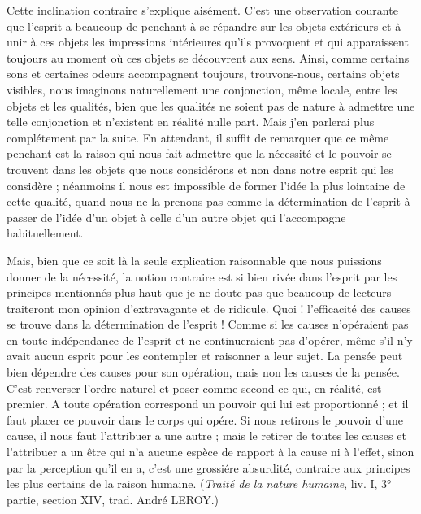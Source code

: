 Cette inclination contraire s’explique aisément. C’est
une observation courante que l'esprit a beaucoup de
penchant à se répandre sur les objets extérieurs et à unir
à ces objets les impressions intérieures qu’ils provoquent
et qui apparaissent toujours au moment où ces objets se
découvrent aux sens. Ainsi, comme certains sons et certaines
odeurs accompagnent toujours, trouvons-nous, certains
objets visibles, nous imaginons naturellement une
conjonction, même locale, entre les objets et les qualités,
bien que les qualités ne soient pas de nature à admettre
une telle conjonction et n’existent en réalité nulle part.
Mais j’en parlerai plus complétement par la suite. En
attendant, il suffit de remarquer que ce même penchant
est la raison qui nous fait admettre que la nécessité et le
pouvoir se trouvent dans les objets que nous considérons
et non dans notre esprit qui les considère ; néanmoins il
nous est impossible de former l'idée la plus lointaine de
cette qualité, quand nous ne la prenons pas comme la
détermination de l’esprit à passer de l'idée d’un objet à
celle d’un autre objet qui l’accompagne habituellement.

Mais, bien que ce soit là la seule explication raisonnable
que nous puissions donner de la nécessité, la notion contraire
est si bien rivée dans l’esprit par les principes mentionnés
plus haut que je ne doute pas que beaucoup de lecteurs
traiteront mon opinion d’extravagante et de ridicule.
Quoi ! l’efficacité des causes se trouve dans la détermination
de l'esprit ! Comme si les causes n’opéraient pas en toute
indépendance de l’esprit et ne continueraient pas d’opérer,
même s’il n’y avait aucun esprit pour les contempler et
raisonner a leur sujet. La pensée peut bien dépendre des
causes pour son opération, mais non les causes de la pensée.
C’est renverser l’ordre naturel et poser comme second ce
qui, en réalité, est premier. A toute opération correspond
un pouvoir qui lui est proportionné ; et il faut placer ce
pouvoir dans le corps qui opére. Si nous retirons le pouvoir
d’une cause, il nous faut l’attribuer a une autre ; mais le
retirer de toutes les causes et l’attribuer a un être qui n’a
aucune espèce de rapport à la cause ni à l’effet, sinon par
la perception qu’il en a, c’est une grossiére absurdité,
contraire aux principes les plus certains de la raison
humaine. ({\it Traité de la nature humaine}, liv. I, 3° partie,
section XIV, trad. André L{\footnotesize EROY}.)

